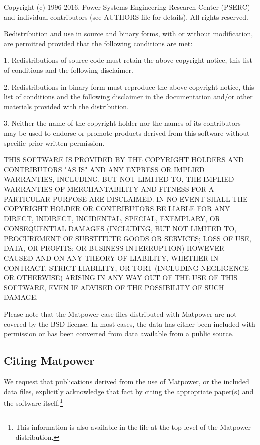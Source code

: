 \documentclass[12pt]{article}
\newcommand{\matpower}[0]{{\sc Matpower}}
\newcommand{\code}[1]{{\relsize{-0.5}{\tt{{#1}}}}}  %
\numberwithin{equation}{section}
\numberwithin{table}{section}
\numberwithin{figure}{section}
\begin{document}
\begin{Notice}
Copyright (c) 1996-2016, Power Systems Engineering Research Center
(PSERC) and individual contributors (see AUTHORS file for details).
All rights reserved.

Redistribution and use in source and binary forms, with or without
modification, are permitted provided that the following conditions
are met:

1. Redistributions of source code must retain the above copyright
notice, this list of conditions and the following disclaimer.

2. Redistributions in binary form must reproduce the above copyright
notice, this list of conditions and the following disclaimer in the
documentation and/or other materials provided with the distribution.

3. Neither the name of the copyright holder nor the names of its
contributors may be used to endorse or promote products derived from
this software without specific prior written permission.

THIS SOFTWARE IS PROVIDED BY THE COPYRIGHT HOLDERS AND CONTRIBUTORS
"AS IS" AND ANY EXPRESS OR IMPLIED WARRANTIES, INCLUDING, BUT NOT
LIMITED TO, THE IMPLIED WARRANTIES OF MERCHANTABILITY AND FITNESS
FOR A PARTICULAR PURPOSE ARE DISCLAIMED. IN NO EVENT SHALL THE
COPYRIGHT HOLDER OR CONTRIBUTORS BE LIABLE FOR ANY DIRECT, INDIRECT,
INCIDENTAL, SPECIAL, EXEMPLARY, OR CONSEQUENTIAL DAMAGES (INCLUDING,
BUT NOT LIMITED TO, PROCUREMENT OF SUBSTITUTE GOODS OR SERVICES;
LOSS OF USE, DATA, OR PROFITS; OR BUSINESS INTERRUPTION) HOWEVER
CAUSED AND ON ANY THEORY OF LIABILITY, WHETHER IN CONTRACT, STRICT
LIABILITY, OR TORT (INCLUDING NEGLIGENCE OR OTHERWISE) ARISING IN
ANY WAY OUT OF THE USE OF THIS SOFTWARE, EVEN IF ADVISED OF THE
POSSIBILITY OF SUCH DAMAGE.
\end{Notice}

Please note that the \matpower{} case files distributed with \matpower{} are not covered by the BSD license. In most cases, the data has either been included with permission or has been converted from data available from a public source.

\subsection{Citing \matpower{}}

We request that publications derived from the use of \matpower{}, or the
included data files, explicitly acknowledge that fact by citing the
appropriate paper(s) and the software itself.\footnote{This information is also available in the \code{CITATION} file at the top level of the \matpower{} distribution.}
\end{document}
